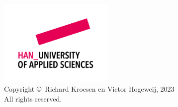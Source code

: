 \begin{flushleft}
  \vspace*{15cm}
  \thispagestyle{empty}
  \noindent%
  \includegraphics[width=55mm]{layout/han/HAN_logo.png}\\  
  Copyright \copyright\ Richard Kroesen en Victor Hogeweij, 2023 \\
  All rights reserved.
  \cleardoublepage
\end{flushleft}
